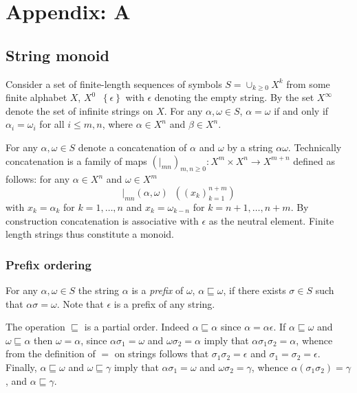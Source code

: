 \documentclass[a4paper]{article}
\newcommand{\obj}[1]{{\left\{ #1 \right \}}}
\newcommand{\brac}[1]{{\left ( #1 \right )}}
\newcommand{\defn}{\mathop{\overset{\Delta}{=}}\nolimits}
\begin{document}
\section{Appendix: A} %
\label{sec:appendix_a}

\subsection{String monoid} %
\label{sub:string_monoid}

Consider a set of finite-length sequences of symbols $S=\cup_{k\geq0} X^k$ from some finite alphabet $X$, $X^0 \defn \obj{ \epsilon }$ with $\epsilon$ denoting the empty string. By the set $X^\infty$ denote the set of infinite strings on $X$. For any $\alpha, \omega\in S$, $\alpha=\omega$ if and only if $\alpha_i = \omega_i$ for all $i\leq m, n$, where $\alpha\in X^n$ and $\beta\in X^n$.

For any $\alpha,\omega\in S$ denote a concatenation of $\alpha$ and $\omega$ by a string $\alpha\omega$. Technically concatenation is a family of maps $\brac{\vert_{mn}}_{m,n\geq 0}:X^m\times X^n\to X^{m+n}$ defined as follows: for any $\alpha\in X^n$ and $\omega\in X^m$ \[\vert_{mn}(\alpha,\omega) \defn \brac{ \brac{x_k}_{k=1}^{n+m} }\] with $x_k=\alpha_k$ for $k=1,\ldots,n$ and $x_k = \omega_{k-n}$ for $k={n+1},\ldots,{n+m}$. By construction concatenation is associative with $\epsilon$ as the neutral element. Finite length strings thus constitute a monoid.

\subsubsection{Prefix ordering} %
\label{ssub:prefix_ordering}

For any $\alpha,\omega \in S$ the string $\alpha$ is a \emph{prefix} of $\omega$, $\alpha\sqsubseteq\omega$, if there exists $\sigma\in S$ such that $\alpha\sigma=\omega$. Note that $\epsilon$ is a prefix of any string.

The operation $\sqsubseteq$ is a partial order. Indeed $\alpha\sqsubseteq\alpha$ since $\alpha = \alpha\epsilon$. If $\alpha\sqsubseteq \omega$ and $\omega \sqsubseteq \alpha$ then $\omega=\alpha$, since $\alpha\sigma_1=\omega$ and $\omega\sigma_2=\alpha$ imply that $\alpha\sigma_1\sigma_2 = \alpha$, whence from the definition of $=$ on strings follows that $\sigma_1\sigma_2=\epsilon$ and $\sigma_1=\sigma_2=\epsilon$. Finally, $\alpha\sqsubseteq\omega$ and $\omega\sqsubseteq\gamma$ imply that $\alpha\sigma_1=\omega$ and $\omega\sigma_2=\gamma$, whence $\alpha(\sigma_1\sigma_2)=\gamma$, and $\alpha\sqsubseteq\gamma$.
\end{document}

